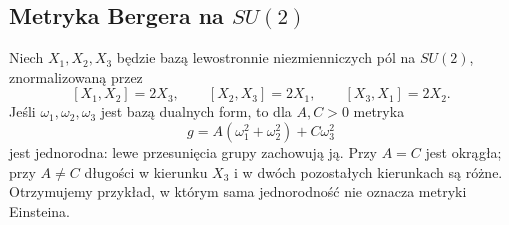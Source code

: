 \subsection*{Metryka Bergera na $SU(2)$}

Niech $X_1,X_2,X_3$ będzie bazą lewostronnie
niezmienniczych pól na $SU(2)$, znormalizowaną przez
\[
 [X_1,X_2]=2X_3,\qquad
 [X_2,X_3]=2X_1,\qquad
 [X_3,X_1]=2X_2.
\]
Jeśli $\omega_1,\omega_2,\omega_3$ jest bazą dualnych
form, to dla $A,C>0$ metryka
\begin{equation}\label{eq:ricci-berger-metric}
 g=A(\omega_1^2+\omega_2^2)+C\omega_3^2
\end{equation}
jest jednorodna: lewe przesunięcia grupy zachowują ją.
Przy $A=C$ jest okrągła; przy $A\ne C$ długości
w kierunku $X_3$ i w dwóch pozostałych kierunkach
są różne. Otrzymujemy przykład, w którym sama
jednorodność nie oznacza metryki Einsteina.

